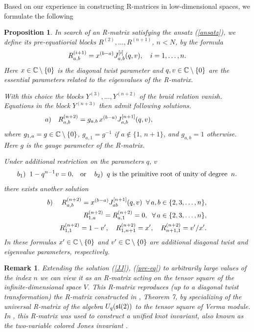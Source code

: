 \documentclass[11pt]{article}
\def\be{\begin{equation}}\def\ee{\end{equation}}
\def\ba{\begin{eqnarray}}\def\ea{\end{eqnarray}}
\newcounter{theorem}\def\thetheorem{\thesection.\arabic{theorem}}\makeatletter
\newtheorem{prop}[theorem]{Proposition}
\newtheorem{rem}[theorem]{Remark}
\begin{document}
Based on our experience in constructing R-matrices in low-dimensional spaces, we formulate the following 
\begin{prop}
In search of an R-matrix satisfying the ansatz (\ref{ansatz}), we define
its pre-equatiorial blocks $R^{(2)},\dots ,R^{(n+1)}$, $n<N$, by the formula
\be
\lb{pre-eq}
R^{(i+1)}_{a,b} = x^{(b-a)}J^{[i]}_{a,b}(q,v), \quad i=1,\dots , n.
\ee
Here $x\in {\Bbb C}\setminus \{0\}$ is the diagonal twist parameter and $q, v\in {\Bbb C}\setminus \{0\}$ are the essential parameters related to the eigenvalues of the R-matrix.

With this choice   the blocks $Y^{(3)}, \dots , Y^{(n+2)}$ of  the braid relation  vanish.
Equations in the block $Y^{(n+3)}$ then admit following solutions.
\ba
\lb{pre-eq-1}
\mbox{$a)$} && R^{(n+2)}_{a,b} = g_{a,b}\, x^{(b-a)}J^{[n+1]}_{a,b}(q,v),\hspace{29mm}
\ea
where $g_{1, a}=g\in  {\Bbb C}\setminus \{0\}$, $g_{a ,1 }=g^{-1}$ if $a\notin\{1,\, n+1\}$, and $g_{a,b}=1$ otherwise. Here $g$ is the gauge parameter of the R-matrix.

Under additional restriction on the parameters $q$, $v$
\be 
\lb{restrict}
\mbox{$b_1)$}\;\;1-q^{n-1} v=0, \;\;\; \mbox{or\;\;\; $b_2)$}\;\;  \mbox{$q$ is the
	primitive root of unity of degree\, $n$.}
\ee
there exists another solution
\ba
\lb{pre-eq-2a}
\mbox{$b)$} && R^{(n+2)}_{a,b} = x^{(b-a)}J^{[n+1]}_{ab}(q,v)\;\;\forall\, a,b\in\{2,3,\dots ,n\},
\\
\lb{pre-eq-2b}
&& R^{(n+2)}_{1,a} =R^{(n+2)}_{a,1} = 0, \;\; \forall\, a\in\{2,3,\dots ,n\},
\\
\lb{pre-eq-2c}
&& R^{(n+2)}_{1,1} =1-v',\quad R^{(n+2)}_{1,n+1} = x', \quad 
R^{(n+2)}_{n+1,1} = v'/x'.
\ea
In these formulas  $x'\in  {\Bbb C}\setminus \{0\}$ and $v'\in  {\Bbb C}\setminus \{0\}$ are additional diagonal twist  and  eigenvalue parameters, respectively.
\end{prop}

\begin{rem}
{\rm
Extending the solution (\ref{JJ}), (\ref{pre-eq}) to arbitrarily large values of the index $n$ we can view it as an R-matrix acting on the tensor square of the infinite-dimensional space $V$. This R-matrix reproduces  (up to a diagonal twist transformation) the R-matrix constructed in \cite{JK}, Theorem 7, by specializing of the  universal R-matrix of the algebra $U_q({\frak{sl}(2)})$ to the tensor square of Verma module. In \cite{Will}, this R-matrix was used to construct a unified knot invariant, 
also known as the two-variable colored Jones invariant \cite{H}.
}
\end{rem}
\end{document}
